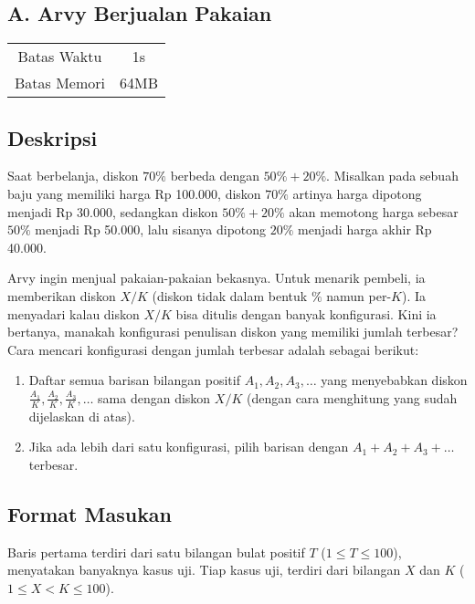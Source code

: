 \documentclass{article}
\begin{document}
\begin{center}
    \section*{A. Arvy Berjualan Pakaian} %

    \begin{tabular}{ | c c | }
        \hline
        Batas Waktu  & 1s \\    %
        Batas Memori & 64MB \\  %
        \hline
    \end{tabular}
\end{center}

\subsection*{Deskripsi}

Saat berbelanja, diskon $70\%$ berbeda dengan $50\% + 20\%$.
Misalkan pada sebuah baju yang memiliki harga Rp 100.000, diskon $70\%$ artinya harga dipotong menjadi Rp 30.000, sedangkan diskon $50\% + 20\%$ akan memotong harga sebesar $50\%$ menjadi Rp 50.000, lalu sisanya dipotong $20\%$ menjadi harga akhir Rp 40.000.

Arvy ingin menjual pakaian-pakaian bekasnya.
Untuk menarik pembeli, ia memberikan diskon $X / K$ (diskon tidak dalam bentuk $\%$ namun per-$K$).
Ia menyadari kalau diskon $X / K$ bisa ditulis dengan banyak konfigurasi.
Kini ia bertanya, manakah konfigurasi penulisan diskon yang memiliki jumlah terbesar?
Cara mencari konfigurasi dengan jumlah terbesar adalah sebagai berikut:
\begin{enumerate}
    \item Daftar semua barisan bilangan positif $A_1, A_2, A_3, \dots$ yang menyebabkan diskon $\frac{A_1}{K}, \frac{A_2}{K}, \frac{A_3}{K} , \dots $ sama dengan diskon $X / K$ (dengan cara menghitung yang sudah dijelaskan di atas).
    \item Jika ada lebih dari satu konfigurasi, pilih barisan dengan $A_1 + A_2 + A_3 + \dots $ terbesar.
\end{enumerate}

\subsection*{Format Masukan}

Baris pertama terdiri dari satu bilangan bulat positif $T$ ($1 \leq T \leq 100$), menyatakan banyaknya kasus uji.
Tiap kasus uji, terdiri dari bilangan $X$ dan $K$ ($1 \leq X < K \leq 100$).
\end{document}
